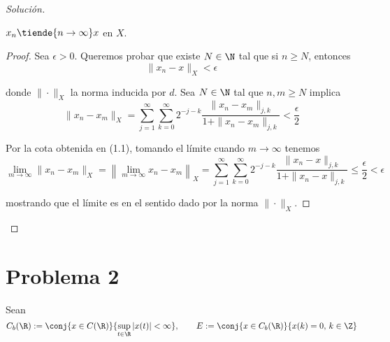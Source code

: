 \documentclass[duedate = 11 de Septiembre, 
			ramo = An\'alisis Funcional, 
			doctype = Tarea 1,
			semester = 2,
			year = 2017]{tarea}
\begin{document}
\begin{proof}[Solución]
\begin{afirmacion}
	\item $x_{n} \tiende{n \to \infty} x$ en $X$.
	
	\begin{proof} Sea $\epsilon > 0$. Queremos probar que existe $N \in \N$ tal que si $n \geq N$, entonces
		$$\|x_{n} - x\|_{X} < \epsilon$$
	
	donde $\|\cdot\|_{X}$ la norma inducida por $d$. Sea $N \in \N$ tal que $n,m \geq N$ implica
		$$\|x_{n} - x_{m}\|_{X} = \sum_{j=1}^{\infty} \sum_{k=0}^{\infty} 2^{-j-k} \frac{\|x_{n}-x_{m}\|_{j,k}}{1 + \|x_{n}-x_{m}\|_{j,k}} < \frac{\epsilon}{2}$$
	
	Por la cota obtenida en (1.1), tomando el límite cuando $m \to \infty$ tenemos
		$$\lim_{m \to \infty} \|x_{n} - x_{m}\|_{X} = \left\|\lim_{m \to \infty} x_{n} - x_{m}\right\|_{X} = \sum_{j=1}^{\infty} \sum_{k=0}^{\infty} 2^{-j-k} \frac{\|x_{n} - x\|_{j,k}}{1 + \|x_{n} - x\|_{j,k}} \leq \frac{\epsilon}{2} < \epsilon$$
	
	mostrando que el límite es en el sentido dado por la norma $\|\cdot\|_{X}$.
	\end{proof}
	\end{afirmacion}

\end{proof}

\newpage
\section*{Problema 2}
Sean
	$$C_{b}(\R) := \conj{x \in C(\R)}{\sup_{t \in \R} |x(t)| < \infty}, \qquad
		E := \conj{x \in C_{b}(\R)}{x(k) = 0, \, k \in \Z}$$
		
\end{document}
